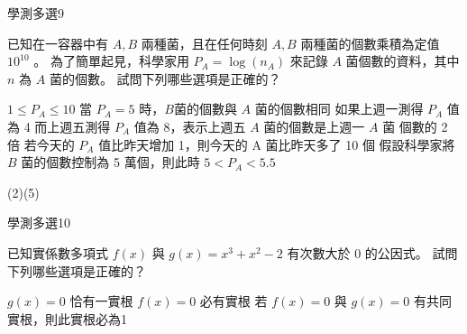\begin{QUESTIONS}
\begin{QUESTION}
        \begin{ExamInfo}{97}{學測}{多選}{9}
        \end{ExamInfo}
        \begin{ExamAnsRateInfo}{33}{65}{24}{10}
        \end{ExamAnsRateInfo}
        \begin{QBODY}
            已知在一容器中有 $A,B$ 兩種菌，且在任何時刻 $A,B$ 兩種菌的個數乘積為定值 $10^{10}$ 。
            為了簡單起見，科學家用 $P_A =\log (n_A)$ 來記錄 $A$ 菌個數的資料，其中 $n$  為 $A$ 菌的個數。
            試問下列哪些選項是正確的？
			\begin{QOPS}
				\QOP $1 \leq P_A \leq 10$
				\QOP 當 $P_A =5$ 時，$B$菌的個數與 $A$ 菌的個數相同 
				\QOP 如果上週一測得 $P_A$ 值為 4 而上週五測得 $P_A$ 值為 8，表示上週五 $A$ 菌的個數是上週一 $A$ 菌
			個數的 2 倍 
				\QOP 若今天的 $P_A$ 值比昨天增加 1，則今天的 A 菌比昨天多了 10 個 
				\QOP 假設科學家將 $B$ 菌的個數控制為 5 萬個，則此時 $5<P_A <5.5$
			\end{QOPS}
        \end{QBODY}
        \begin{QFROMS}
        \end{QFROMS}
        \begin{QTAGS}\end{QTAGS}
        \begin{QANS}
            (2)(5)
        \end{QANS}
        \begin{QSOLLIST}
        \end{QSOLLIST}
        \begin{QEMPTYSPACE}
        \end{QEMPTYSPACE}
    \end{QUESTION}
    \begin{QUESTION}
        \begin{ExamInfo}{97}{學測}{多選}{10}
        \end{ExamInfo}
        \begin{ExamAnsRateInfo}{26}{52}{16}{10}
        \end{ExamAnsRateInfo}
        \begin{QBODY}
            已知實係數多項式 $f(x)$ 與 $g(x) = x^3 + x^2 - 2$ 有次數大於 $0$ 的公因式。
			試問下列哪些選項是正確的？
			\begin{QOPS}
				\QOP $g(x)=0$ 恰有一實根 
				\QOP $f(x)=0$ 必有實根 
				\QOP 若 $f(x)=0$ 與 $g(x)=0$ 有共同實根，則此實根必為1 

\end{QOPS}
\end{QBODY}
\end{QUESTION}
\end{QUESTIONS}
